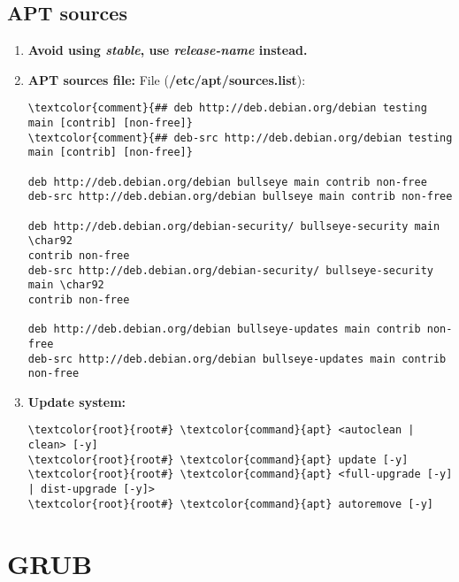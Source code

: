 \documentclass[10pt, a4paper, onecolumn, openany]{book} %
\begin{document}
\section{APT sources}
\begin{enumerate}
    \item \textbf{Avoid using \textit{stable}, use \textit{release-name} instead.}
    \item \textbf{APT sources file:}
\newline File (\textbf{\textcolor{file}{/etc/apt/sources.list}}):
\begin{Verbatim}[commandchars=\\\{\}]
\textcolor{comment}{## deb http://deb.debian.org/debian testing main [contrib] [non-free]}
\textcolor{comment}{## deb-src http://deb.debian.org/debian testing main [contrib] [non-free]}

deb http://deb.debian.org/debian bullseye main contrib non-free
deb-src http://deb.debian.org/debian bullseye main contrib non-free

deb http://deb.debian.org/debian-security/ bullseye-security main \char92
contrib non-free
deb-src http://deb.debian.org/debian-security/ bullseye-security main \char92
contrib non-free

deb http://deb.debian.org/debian bullseye-updates main contrib non-free
deb-src http://deb.debian.org/debian bullseye-updates main contrib non-free
\end{Verbatim}
    \item \textbf{Update system:}
\begin{Verbatim}[commandchars=\\\{\}]
\textcolor{root}{root#} \textcolor{command}{apt} <autoclean | clean> [-y]
\textcolor{root}{root#} \textcolor{command}{apt} update [-y]
\textcolor{root}{root#} \textcolor{command}{apt} <full-upgrade [-y] | dist-upgrade [-y]>
\textcolor{root}{root#} \textcolor{command}{apt} autoremove [-y]
\end{Verbatim}
\end{enumerate}
\chapter{GRUB}
\end{document}
